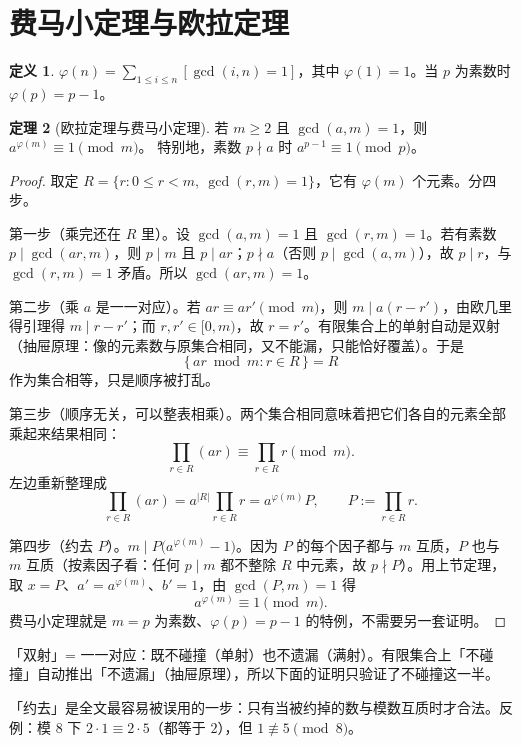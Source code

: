 \documentclass[UTF8,a4paper,11pt,twoside,openright,fontset=fandol]{ctexbook}
\theoremstyle{definition}
\newtheorem{definition}{定义}[chapter]
\newtheorem{theorem}[definition]{定理}
\newcommand{\iva}[1]{\left[#1\right]}
\begin{document}
\section{费马小定理与欧拉定理}
\begin{definition}
$\varphi(n)=\sum_{1\le i\le n}\iva{\gcd(i,n)=1}$，其中 $\varphi(1)=1$。当 $p$ 为素数时 $\varphi(p)=p-1$。
\end{definition}
\begin{theorem}[欧拉定理与费马小定理]
若 $m\ge2$ 且 $\gcd(a,m)=1$，则 $a^{\varphi(m)}\equiv1\pmod m$。
特别地，素数 $p\nmid a$ 时 $a^{p-1}\equiv1\pmod p$。
\end{theorem}
\begin{proof}
取定 $R=\{r:0\le r<m,\ \gcd(r,m)=1\}$，它有 $\varphi(m)$ 个元素。分四步。

第一步（乘完还在 $R$ 里）。设 $\gcd(a,m)=1$ 且 $\gcd(r,m)=1$。若有素数 $p\mid\gcd(ar,m)$，则 $p\mid m$ 且 $p\mid ar$；$p\nmid a$（否则 $p\mid\gcd(a,m)$），故 $p\mid r$，与 $\gcd(r,m)=1$ 矛盾。所以 $\gcd(ar,m)=1$。

第二步（乘 $a$ 是一一对应）。若 $ar\equiv ar'\pmod m$，则 $m\mid a(r-r')$，由欧几里得引理得 $m\mid r-r'$；而 $r,r'\in[0,m)$，故 $r=r'$。有限集合上的单射自动是双射（抽屉原理：像的元素数与原集合相同，又不能漏，只能恰好覆盖）。于是
\[
 \{\,ar\bmod m:r\in R\,\}=R
\]
作为集合相等，只是顺序被打乱。

第三步（顺序无关，可以整表相乘）。两个集合相同意味着把它们各自的元素全部乘起来结果相同：
\[
 \prod_{r\in R}(ar)\equiv\prod_{r\in R}r\pmod m.
\]
左边重新整理成
\[
 \prod_{r\in R}(ar)=a^{|R|}\prod_{r\in R}r=a^{\varphi(m)}P,\qquad P:=\prod_{r\in R}r .
\]

第四步（约去 $P$）。$m\mid P\big(a^{\varphi(m)}-1\big)$。因为 $P$ 的每个因子都与 $m$ 互质，$P$ 也与 $m$ 互质（按素因子看：任何 $p\mid m$ 都不整除 $R$ 中元素，故 $p\nmid P$）。用上节定理，取 $x=P$、$a'=a^{\varphi(m)}$、$b'=1$，由 $\gcd(P,m)=1$ 得
\[
 a^{\varphi(m)}\equiv1\pmod m.
\]
费马小定理就是 $m=p$ 为素数、$\varphi(p)=p-1$ 的特例，不需要另一套证明。
\end{proof}

\begin{tip}[词义：双射（这里为何只验一半）]
「双射」= 一一对应：既不碰撞（单射）也不遗漏（满射）。有限集合上「不碰撞」自动推出「不遗漏」（抽屉原理），所以下面的证明只验证了不碰撞这一半。
\end{tip}

\begin{tip}[小心：约去必须互质]
「约去」是全文最容易被误用的一步：只有当被约掉的数与模数互质时才合法。反例：模 $8$ 下 $2\cdot1\equiv2\cdot5$（都等于 $2$），但 $1\not\equiv5\pmod 8$。
\end{tip}
\end{document}
